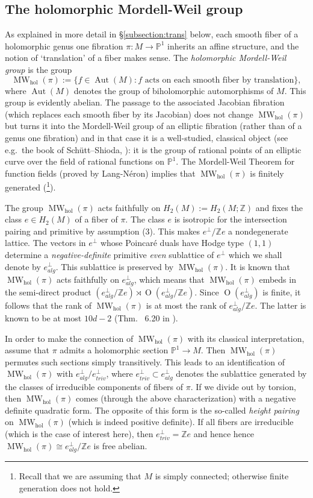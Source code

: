 \documentclass[10pt,letterpaper]{amsart}
\numberwithin{equation}{section}
\def\PP{{\mathbb P}}
\def\Pb{{\mathbb P}}
\def\ZZ{{\mathbb Z}}
\def\Zb{{\mathbb Z}}
\def\hol{\mathrm{hol}}
\newcommand\aut{\operatorname{Aut}}
\newcommand\MW{\operatorname{MW}}
\newcommand\Orth{\operatorname{O}}
\theoremstyle{remark}
\begin{document}
\subsection{The holomorphic Mordell-Weil group}
As explained in more detail in  \S\ref{subsection:trans} below, each smooth fiber of a holomorphic genus one fibration $\pi:M\to\Pb^1$ inherits an affine structure, and the notion of `translation' of a fiber makes sense.   
The {\em holomorphic Mordell-Weil group} is the group 
\[
\MW_{\hol}(\pi):=\{f\in\aut(M): \text{$f$ acts on each smooth fiber by translation}\},
\]
where $\aut(M)$ denotes the group of biholomorphic automorphisms of $M$.  This group is evidently abelian.  The passage to the  associated Jacobian fibration (which replaces each smooth fiber by its Jacobian) does not change $\MW_{\hol}(\pi)$ but turns it into the Mordell-Weil group of an elliptic fibration (rather than of a genus one fibration) and in that case it is a well-studied, classical object (see e.g.\ the book of Sch\"utt--Shioda, \cite{shioda}): it is the group of rational points of an elliptic curve over the field of rational functions on $\Pb^1$.  The Mordell-Weil Theorem for function fields (proved by Lang-N\'eron) implies that $\MW_\hol(\pi)$ is finitely generated (\footnote{Recall that we are assuming that $M$ is simply connected; otherwise finite generation does not hold.}).  


The group $\MW_\hol(\pi)$ acts faithfully on $H_2(M):=H_2(M;\Zb)$ and  fixes the class $e\in H_2(M)$ of a fiber of $\pi$. The class $e$ is isotropic for the intersection pairing and primitive by assumption (3).  This makes  $e^\perp/\Zb e$ a nondegenerate lattice.  The vectors in $e^\perp$  whose Poincar\'e duals have Hodge type $(1,1)$  determine  a \emph{negative-definite} primitive \emph{even} sublattice of $e^\perp$ which we shall denote by $e^\perp_{alg}$. This sublattice is preserved by $\MW_\hol(\pi)$. It is known that $\MW_\hol(\pi)$  acts faithfully  on  $e^\perp_{alg}$, which means that $\MW_\hol(\pi)$ embeds in the 
semi-direct product  
$(e^\perp_{alg}/\Zb e)\rtimes \Orth(e^\perp_{alg}/\Zb e)$.  Since $\Orth(e^\perp_{alg})$ is finite, it follows that the  rank of $\MW_\hol(\pi)$ is at most the rank of    $e^\perp_{alg}/\Zb e$. The latter  is  known to be at most $10d-2$  (Thm.~ 6.20 in \cite{shioda}).  

In order to make the connection of $\MW_\hol(\pi)$ with its classical interpretation, assume that $\pi$ admits a holomorphic section $\PP^1\to M$.  Then  $\MW_\hol(\pi)$ permutes such sections  simply transitively. This leads to an identification of   $\MW_\hol(\pi)$  with $e^\perp_{alg}/e^\perp_{triv}$, where  $e^\perp_{triv} \subset e^\perp_{alg}$ denotes the sublattice generated by the classes of irreducible  components of fibers of $\pi$. 
If we divide out by torsion, then $\MW_\hol(\pi)$ comes (through the above characterization) with a negative definite quadratic form.  The  opposite of this form is  the so-called {\em height pairing} on $\MW_\hol(\pi)$ (which is indeed positive definite). If  all fibers are irreducible (which is the case of interest here), then $e^\perp_{triv}=\ZZ e$ and hence hence $\MW_\hol(\pi)\cong e^\perp_{alg}/\ZZ e$ is free abelian.
\end{document}

